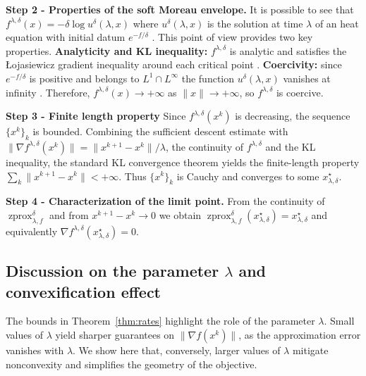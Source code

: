 \documentclass{article}
\newcommand{\zprox}{\ensuremath{\operatorname{zprox}}}
\begin{document}
{\bf Step 2 - Properties of the soft Moreau envelope.}
It is possible to see that $f^{\lambda,\delta}(x)=
-\delta\log u^\delta(\lambda,x)$ where $u^\delta(\lambda,x)$ is the solution at time $\lambda$ of an heat equation with initial datum $e^{-f/\delta}$ \cite{osher2023hamilton}. This point of view provides two key properties. \textbf{Analyticity and KL inequality:}  $f^{\lambda,\delta}$  is analytic \cite[Section 2.3]{evans} and satisfies the {\L}ojasiewicz gradient inequality around each critical point \cite{Lojasiewicz1963}. \textbf{Coercivity:} since $e^{-f/\delta}$ is positive and belongs to $L^1\cap L^\infty$ the function $u^\delta(\lambda,x)$ vanishes at infinity \cite[Proposition 8.8]{folland1999real}. Therefore, \(f^{\lambda,\delta}(x)\to+\infty\) as \(\|x\|\to+\infty\), so
\(f^{\lambda,\delta}\) is coercive.

{\bf Step 3 - Finite length property}  Since \(f^{\lambda,\delta}(x^k)\) is
decreasing, the sequence \(\{x^k\}_k\) is bounded. Combining the sufficient descent estimate with $\|\nabla f^{\lambda,\delta}(x^k)\| =\|x^{k+1}-x^k\|/\lambda$,
the continuity of $f^{\lambda, \delta}$ and the KL inequality, the standard KL convergence theorem \cite[Theorem 2.9]{attouch2013convergence} yields the finite-length property $\sum_k \|x^{k+1}-x^k\| < +\infty$.  Thus \(\{x^k\}_k\) is Cauchy and converges to some \(x_{\lambda,\delta}^\star\). 

{\bf Step 4 - Characterization of the limit point.}
From the continuity of $\zprox_{\lambda, f}^\delta$ and from
\(x^{k+1}-x^k\to 0\) we obtain
$\zprox_{\lambda, f}^\delta(x_{\lambda,\delta}^\star)=x_{\lambda,\delta}^\star$ and equivalently $
\nabla f^{\lambda,\delta}(x_{\lambda,\delta}^\star)=0$.

\subsection{Discussion on the parameter $\lambda$ and convexification effect}

The bounds in Theorem~\ref{thm:rates} highlight the role of the parameter $\lambda$. Small values of $\lambda$ yield sharper guarantees on $\|\nabla f(x^k)\|$, as the approximation error vanishes with $\lambda$. We show here that, conversely, larger values of $\lambda$ mitigate nonconvexity and simplifies the geometry of the objective.
\end{document}
